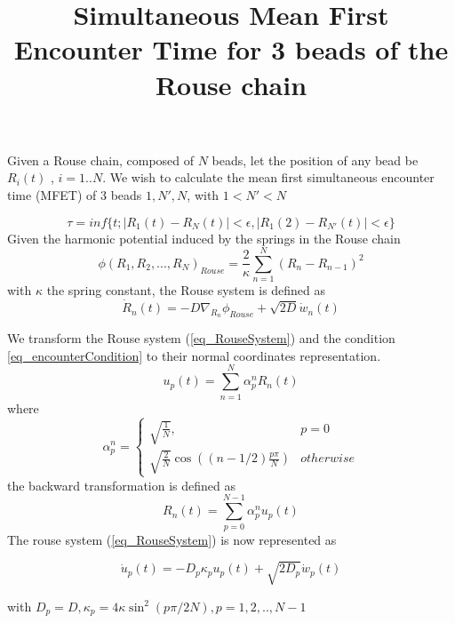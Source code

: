 \documentclass{report}
\title{Simultaneous Mean First Encounter Time for 3 beads of the Rouse chain}
\begin{document}
	\maketitle
 Given a Rouse chain, composed of $N$ beads, let the position of any bead be $R_i(t)$ , $i=1..N$. 	We wish to calculate the mean first simultaneous encounter time (MFET) of 3 beads $1,N',N$, with $1<N'<N$
  
	\begin{equation}\label{eq_encounterCondition}
	\tau=inf \{t ; |R_1(t)-R_N(t)|< \epsilon , |R_1(2)-R_{N'}(t)|<\epsilon \}
	\end{equation}
	Given the harmonic potential induced by the springs in the Rouse chain 
	\begin{equation}
	\phi(R_1,R_2,...,R_N)_{Rouse}=\frac{2}{\kappa}\sum_{n=1}^N (R_n-R_{n-1})^2
	\end{equation}
	with $\kappa$ the spring constant, the Rouse system is defined as 
	\begin{equation}\label{eq_RouseSystem}
	\dot{R}_n(t) = -D\nabla_{R_n}\phi_{Rouse} +\sqrt{2D}\dot{w}_n(t)
	\end{equation}

 We transform the Rouse system (\ref{eq_RouseSystem}) and the condition \ref{eq_encounterCondition} to their normal coordinates representation.
 \begin{equation}\label{eq_normalTransform}
 u_p(t)=\sum_{n=1}^N \alpha ^n_p R_n(t)
 \end{equation} 
 where 
 \begin{equation}\label{eq_eigenValues}
 \alpha_p^n = \begin{cases}
\sqrt{\frac{1}{N}}, & p=0 \\
\sqrt{\frac{2}{N}}\cos((n-1/2)\frac{p\pi}{N})  & otherwise
 \end{cases}
 \end{equation}
 the backward transformation is defined as 
 \begin{equation}\label{eq_backTransform}
 R_n(t) =\sum_{p=0}^{N-1}\alpha_p^n u_p(t)
 \end{equation}
 	The rouse system (\ref{eq_RouseSystem}) is now represented as 
 	
 \begin{equation}\label{eq_RouseSystemNormalCoordinates}
 \dot{u}_p(t)=-D_p\kappa_pu_p(t)+\sqrt{2D_p}\dot{w}_p(t)
 \end{equation}
 
 with $D_p=D, \kappa_p = 4\kappa \sin^2(p\pi /2N), p=1,2,..,N-1$
 
\end{document}
